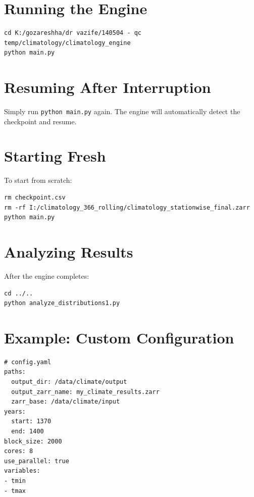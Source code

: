 ﻿\documentclass[12pt,a4paper]{report}
\begin{document}
\section{Running the Engine}
\begin{lstlisting}[caption=Basic Execution]
cd K:/gozareshha/dr vazife/140504 - qc temp/climatology/climatology_engine
python main.py
\end{lstlisting}

\section{Resuming After Interruption}
Simply run \texttt{python main.py} again. The engine will automatically detect the checkpoint and resume.

\section{Starting Fresh}
To start from scratch:
\begin{lstlisting}[caption=Starting Fresh]
rm checkpoint.csv
rm -rf I:/climatology_366_rolling/climatology_stationwise_final.zarr
python main.py
\end{lstlisting}

\section{Analyzing Results}
After the engine completes:
\begin{lstlisting}[caption=Analyzing Results]
cd ../..
python analyze_distributions1.py
\end{lstlisting}

\section{Example: Custom Configuration}
\begin{lstlisting}[caption=Custom Configuration Example]
# config.yaml
paths:
  output_dir: /data/climate/output
  output_zarr_name: my_climate_results.zarr
  zarr_base: /data/climate/input
years:
  start: 1370
  end: 1400
block_size: 2000
cores: 8
use_parallel: true
variables:
- tmin
- tmax
\end{lstlisting}
\end{document}
